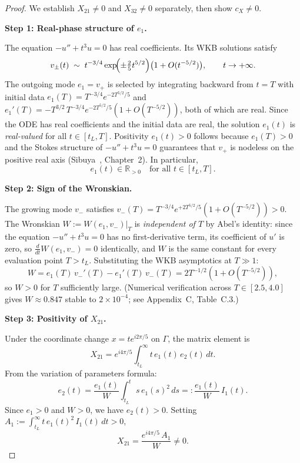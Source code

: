 \documentclass[12pt,a4paper]{amsart}
\theoremstyle{remark}
\begin{document}
\begin{proof}
We establish $X_{21} \neq 0$ and $X_{32} \neq 0$ separately, then
show $c_X \neq 0$.

\medskip
\noindent\textbf{Step 1: Real-phase structure of $e_1$.}

The equation $-u'' + t^3 u = 0$ has real coefficients. Its WKB
solutions satisfy
\[
  v_\pm(t) \;\sim\; t^{-3/4}\exp\!\Bigl(\pm\tfrac{2}{5}t^{5/2}\Bigr)
  \bigl(1 + O(t^{-5/2})\bigr), \qquad t \to +\infty.
\]
The outgoing mode $e_1 = v_+$ is selected by integrating backward
from $t = T$ with initial data
$e_1(T) = T^{-3/4}e^{-2T^{5/2}/5}$ and
$e_1'(T) = -T^{3/2}\,T^{-3/4}e^{-2T^{5/2}/5}(1+O(T^{-5/2}))$,
both of which are real. Since the ODE has real coefficients and the
initial data are real, the solution $e_1(t)$ is \emph{real-valued}
for all $t \in [t_L, T]$. Positivity $e_1(t) > 0$ follows because
$e_1(T) > 0$ and the Stokes structure of $-u''+t^3u=0$ guarantees
that $v_+$ is nodeless on the positive real axis
(Sibuya~\cite{Sibuya75}, Chapter~2). In particular,
\begin{equation}\label{eq:e1_real}
  e_1(t) \in \mathbb{R}_{>0} \quad \text{for all } t \in [t_L, T].
\end{equation}

\medskip
\noindent\textbf{Step 2: Sign of the Wronskian.}

The growing mode $v_-$ satisfies $v_-(T) = T^{-3/4}e^{+2T^{5/2}/5}(1+O(T^{-5/2})) > 0$.
The Wronskian $W := W(e_1, v_-)\big|_T$ is \emph{independent of $T$}
by Abel's identity: since the equation $-u''+t^3u=0$ has no first-derivative
term, its coefficient of $u'$ is zero, so
$\tfrac{d}{dt}W(e_1,v_-) = 0$ identically, and $W$ is the same constant
for every evaluation point $T > t_L$.
Substituting the WKB asymptotics at $T\gg 1$:
\[
  W = e_1(T)\,v_-'(T) - e_1'(T)\,v_-(T)
    = 2T^{-1/2}(1 + O(T^{-5/2})),
\]
so $W > 0$ for $T$ sufficiently large. (Numerical verification across
$T \in [2.5, 4.0]$ gives $W \approx 0.847$ stable to $2\times 10^{-4}$;
see Appendix~C, Table~C.3.)

\medskip
\noindent\textbf{Step 3: Positivity of $X_{21}$.}

Under the coordinate change $x = te^{i2\pi/5}$ on $\Gamma$, the
matrix element is
\[
  X_{21} = e^{i4\pi/5}\int_{t_L}^\infty t\,e_1(t)\,e_2(t)\,dt.
\]
From the variation of parameters formula:
\[
  e_2(t) = \frac{e_1(t)}{W}\int_{t_L}^t s\,e_1(s)^2\,ds
          =: \frac{e_1(t)}{W}\,I_1(t).
\]
Since $e_1 > 0$ and $W > 0$, we have $e_2(t) > 0$. Setting
$A_1 := \int_{t_L}^\infty t\,e_1(t)^2\,I_1(t)\,dt > 0$,
\[
  X_{21} = \frac{e^{i4\pi/5}\,A_1}{W} \neq 0.
\]


\end{proof}
\end{document}
